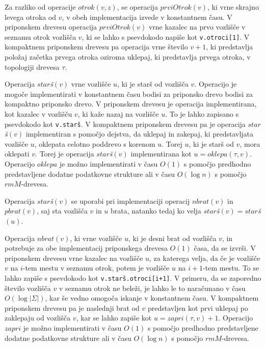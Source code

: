 Za razliko od operacije $otrok(v,z)$, se operacija $prviOtrok(v)$, ki vrne skrajno levega otroka od $v$, v obeh implementacija izvede v konstantnem času. V priponskem drevesu operacija $prviOtrok(v)$ vrne kazalec na prvo vozlišče v seznamu otrok vozlišča $v$, ki se lahko s psevdokodo napiše kot \verb|v.otroci[1]|. V kompaktnem priponskem drevesu pa operacija vrne število $v+1$, ki predstavlja položaj začetka prvega otroka oziroma uklepaj, ki predstavlja prvega otroka, v topologiji drevesa $\tau$. 

Operacija $star$\textit{š}$(v)$ vrne vozlišče $u$, ki je starš od vozlišča $v$. Operacijo je mogoče implementirati v konstantnem času bodisi za priponsko drevo bodisi za kompaktno priponsko drevo. V priponskem drevesu je operacija implementirana, kot kazalec v vozlišču $v$, ki kaže nazaj na vozlišče $u$. To je lahko zapisano s psevdokodo kot \verb|v.starš|. V kompaktnem priponskem drevesu pa je operacija $star$\textit{š}$(v)$ implementiran s pomočjo dejstva, da uklepaj in zakepaj, ki predstavljata vozlišče $u$, oklepata celotno poddrevo s korenom $u$. Torej $u$, ki je starš od $v$, mora oklepati $v$. Torej je operacija $star$\textit{š}$(v)$ implementirana kot $u=oklepa(\tau,v)$. Operacijo $oklepa$ je možno implementirati v času $O(1)$ s pomočjo predhodno predstavljene dodatne podatkovne strukture ali v času $O(\log{n})$ s pomočjo $rmM$-drevesa.

Operacija $star$\textit{š}$(v)$ se uporabi pri implementaciji operacij $nbrat(v)$ in $pbrat(v)$, saj sta vozlišča $v$ in $u$ brata, natanko tedaj ko velja $star$\textit{š}$(v)=star$\textit{š}$(u)$.

Operacija $nbrat(v)$, ki vrne vozlišče $u$, ki je desni brat od vozlišča $v$, in potrebuje za obe implementacij priponskega drevesa $O(1)$ časa, da se izvrši. V priponskem drevesu vrne kazalec na vozlišče $u$, za katerega velja, da če je vozlišče $v$ na $i$-tem mestu v seznamu otrok, potem je vozlišče $u$ na $i+1$-tem mestu. To se lahko zapiše s psevdokodo kot \verb|v.starš.otroci[i+1]|. V primeru, da se zaporedno število vozlišča $v$ v seznamu otrok ne beleži, je lahko le to naračunano v času $O(\log|\Sigma|)$, kar še vedno omogoča iskanje v konstantnem času. V kompaktnem priponskem drevesu pa je naslednji brat od $v$ predstavljen kot prvi uklepaj po zaklepaju od vozlišča $v$, kar se lahko zapiše kot $u=zapri(\tau, v)+1$. Operacijo $zapri$ je možno implementirati v času $O(1)$ s pomočjo predhodno predstavljene dodatne podatkovne strukture ali v času $O(\log{n})$ s pomočjo $rmM$-drevesa.


